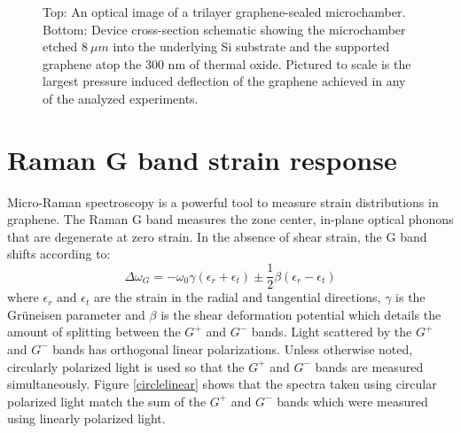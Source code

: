 \begin{figure}
\begin{center}
\end{center}
\caption{\label{device} Top: An optical image of a trilayer graphene-sealed microchamber. Bottom: Device cross-section schematic showing the microchamber etched $8 \ \mu m$ into the underlying Si substrate and the supported graphene atop the 300 nm of thermal oxide.  Pictured to scale is the largest pressure induced deflection of the graphene achieved in any of the analyzed experiments.}
\end{figure}

\section{Raman G band strain response}
Micro-Raman spectroscopy is a powerful tool to measure strain distributions in graphene.  The Raman G band measures the zone center, in-plane optical phonons that are degenerate at zero strain.  In the absence of shear strain, the G band shifts according to\cite{Huang2009}:
\begin{equation}
\Delta \omega_G=-\omega_0 \gamma(\epsilon_{r}+\epsilon_{t}) \pm \frac{1}{2} \beta (\epsilon_{r}-\epsilon_{t})
\end{equation}
where $\epsilon_{r}$ and $\epsilon_{t}$ are the strain in the radial and tangential directions,  $\gamma$ is the Gr\"{u}neisen parameter and $\beta$ is the shear deformation potential which details the amount of splitting between the $G^+$ and $G^-$ bands.  Light scattered by the $G^+$ and $G^-$  bands has orthogonal linear polarizations\cite{Huang2009}.  Unless otherwise noted, circularly polarized light is used so that the $G^+$ and $G^-$ bands are measured simultaneously.  Figure \ref{circlelinear} shows that the spectra taken using circular polarized light match the sum of the $G^+$ and $G^-$ bands which were measured using linearly polarized light.

